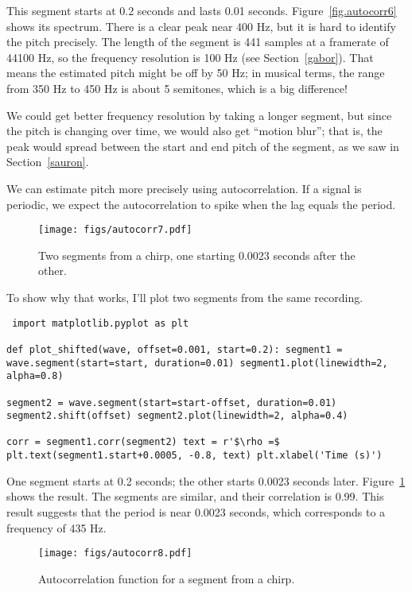 \documentclass[12pt]{book} \usepackage[width=5.5in,height=8.5in, hmarginratio=3:2,vmarginratio=1:1]{geometry}
\begin{document}
This segment starts at 0.2 seconds and lasts 0.01 seconds. Figure~\ref{fig.autocorr6} shows its spectrum. There is a clear peak near 400 Hz, but it is hard to identify the pitch precisely. The length of the segment is 441 samples at a framerate of 44100 Hz, so the frequency resolution is 100 Hz (see Section~\ref{gabor}). That means the estimated pitch might be off by 50 Hz; in musical terms, the range from 350 Hz to 450 Hz is about 5 semitones, which is a big difference! 

We could get better frequency resolution by taking a longer segment, but since the pitch is changing over time, we would also get ``motion blur''; that is, the peak would spread between the start and end pitch of the segment, as we saw in Section~\ref{sauron}. 

We can estimate pitch more precisely using autocorrelation. If a signal is periodic, we expect the autocorrelation to spike when the lag equals the period. 

\begin{figure} 

\centerline{\texttt{[image: figs/autocorr7.pdf]}} \caption{Two segments from a chirp, one starting 0.0023 seconds after the other.} \label{fig.autocorr7} \end{figure} 

To show why that works, I'll plot two segments from the same recording. 

\begin{verbatim} import matplotlib.pyplot as plt 

def plot_shifted(wave, offset=0.001, start=0.2): segment1 = wave.segment(start=start, duration=0.01) segment1.plot(linewidth=2, alpha=0.8) 

segment2 = wave.segment(start=start-offset, duration=0.01) segment2.shift(offset) segment2.plot(linewidth=2, alpha=0.4) 

corr = segment1.corr(segment2) text = r'$\rho =$ plt.text(segment1.start+0.0005, -0.8, text) plt.xlabel('Time (s)') \end{verbatim} 

One segment starts at 0.2 seconds; the other starts 0.0023 seconds later. Figure~\ref{fig.autocorr7} shows the result. The segments are similar, and their correlation is 0.99. This result suggests that the period is near 0.0023 seconds, which corresponds to a frequency of 435 Hz. 

\begin{figure} 

\centerline{\texttt{[image: figs/autocorr8.pdf]}} \caption{Autocorrelation function for a segment from a chirp.} \label{fig.autocorr8} \end{figure} 
\end{document}
